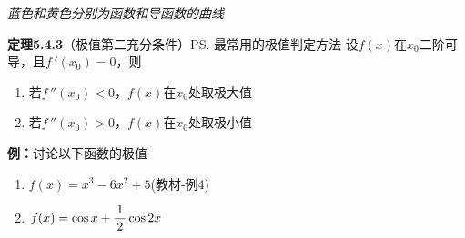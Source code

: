 \begin{center}
	\quad
	
	{\it 蓝色和黄色分别为函数和导函数的曲线}
\end{center}

{\bf 定理5.4.3}（极值第二充分条件）\ps{最常用的极值判定方法}
设$f(x)$在$x_0$二阶可导，且$f\,'(x_0)=0$，则
\begin{enumerate}[(1)]
  \setlength{\itemindent}{1cm}
  \item 若$f\,''(x_0)<0$，$f(x)$在$x_0$处取极大值 
  \item 若$f\,''(x_0)>0$，$f(x)$在$x_0$处取极小值
\end{enumerate}

{\bf 例：}讨论以下函数的极值
\begin{enumerate}[(1)]
  \setlength{\itemindent}{1cm}
  \item $f(x)=x^3-6x^2+5$\hfill (教材-例4)
  \item $f(x)=\cos x+\displaystyle\frac{\,{1}\,}{\,{2}\,}\cos 2x$
\end{enumerate}

